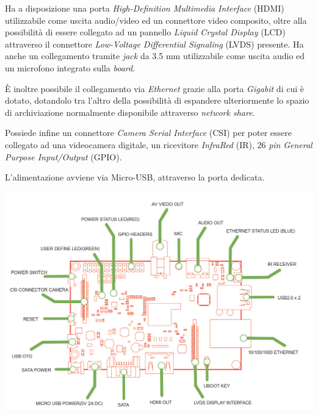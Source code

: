 Ha a disposizione una porta \textit{High-Definition Multimedia Interface} 
(HDMI) utilizzabile come uscita audio/video ed un connettore video composito, 
oltre alla possibilità di essere collegato ad un pannello \textit{Liquid 
Crystal Display} (LCD) attraverso il connettore \textit{Low-Voltage 
Differential Signaling} (LVDS) presente. Ha anche un collegamento tramite 
\emph{jack} da 3.5 mm utilizzabile come uscita audio ed un microfono integrato 
sulla \emph{board}.

\`E inoltre possibile il collegamento via \textit{Ethernet} grazie alla porta 
\textit{Gigabit} di cui è dotato, dotandolo tra l'altro della possibilità di 
espandere ulteriormente lo spazio di archiviazione normalmente disponibile 
attraverso \emph{network share}.

Possiede infine un connettore \textit{Camera Serial Interface} (CSI) per poter 
essere collegato ad una videocamera digitale, un ricevitore \textit{InfraRed} 
(IR), 26 \textit{pin} \textit{General Purpose Input/Output} (GPIO).

L'alimentazione avviene via Micro-USB, attraverso la porta dedicata.

\includegraphics[width=1\textwidth]{Figures/bananapi_schema.png}